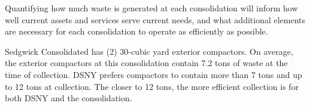 
    Quantifying how much waste is generated at each consolidation will inform how well current assets and services serve current needs, and what additional elements are necessary for each consolidation to operate as efficiently as possible.
    
    Sedgwick Consolidated has (2) 30-cubic yard exterior compactors. On average, the exterior compactors at this consolidation contain 7.2 tons of waste at the time of collection. DSNY prefers compactors to contain more than 7 tons and up to 12 tons at collection. The closer to 12 tons, the more efficient collection is for both DSNY and the consolidation.
